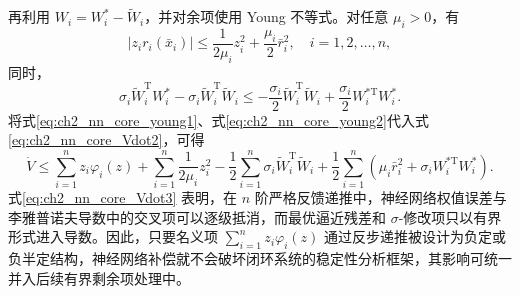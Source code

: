 再利用 $W_i=W_i^\ast-\tilde W_i$，并对余项使用 Young 不等式。对任意 $\mu_i>0$，有
\begin{equation}\label{eq:ch2_nn_core_young1}
  |z_i r_i(\bar x_i)|\le \frac{1}{2\mu_i}z_i^2+\frac{\mu_i}{2}\bar r_i^2,\quad i=1,2,\ldots,n,
\end{equation}
同时，
\begin{equation}\label{eq:ch2_nn_core_young2}
  \sigma_i\tilde W_i^{\mathrm T}W_i^\ast-\sigma_i\tilde W_i^{\mathrm T}\tilde W_i
  \le -\frac{\sigma_i}{2}\tilde W_i^{\mathrm T}\tilde W_i+\frac{\sigma_i}{2}W_i^{\ast\mathrm T}W_i^\ast.
\end{equation}
将式\eqref{eq:ch2_nn_core_young1}、式\eqref{eq:ch2_nn_core_young2}代入式\eqref{eq:ch2_nn_core_Vdot2}，可得
\begin{equation}\label{eq:ch2_nn_core_Vdot3}
  \dot V
  \le \sum_{i=1}^{n}z_i\varphi_i(z)+\sum_{i=1}^{n}\frac{1}{2\mu_i}z_i^2
  -\frac{1}{2}\sum_{i=1}^{n}\sigma_i\tilde W_i^{\mathrm T}\tilde W_i
  +\frac{1}{2}\sum_{i=1}^{n}\left(\mu_i\bar r_i^2+\sigma_iW_i^{\ast\mathrm T}W_i^\ast\right).
\end{equation}
式\eqref{eq:ch2_nn_core_Vdot3} 表明，在 $n$ 阶严格反馈递推中，神经网络权值误差与李雅普诺夫导数中的交叉项可以逐级抵消，而最优逼近残差和 $\sigma$-修改项只以有界形式进入导数。因此，只要名义项 $\sum_{i=1}^{n}z_i\varphi_i(z)$ 通过反步递推被设计为负定或负半定结构，神经网络补偿就不会破坏闭环系统的稳定性分析框架，其影响可统一并入后续有界剩余项处理中。

